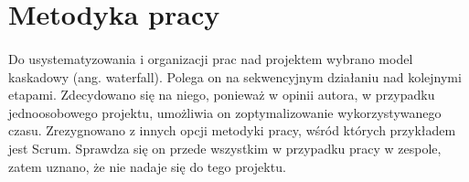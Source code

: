 \section{Metodyka pracy}

\paragraph{}
Do usystematyzowania i organizacji prac nad projektem wybrano model kaskadowy (ang. waterfall). Polega on na sekwencyjnym działaniu nad kolejnymi etapami. Zdecydowano się na niego, ponieważ w opinii autora, w przypadku jednoosobowego projektu, umożliwia on zoptymalizowanie wykorzystywanego czasu. Zrezygnowano z innych opcji metodyki pracy, wśród których przykładem jest Scrum. Sprawdza się on przede wszystkim w przypadku pracy w zespole, zatem uznano, że nie nadaje się do tego projektu.
